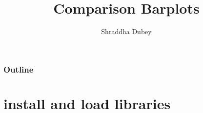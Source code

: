 \documentclass{beamer}\usepackage[]{graphicx}\usepackage[]{color}
\begin{document}
\title{Comparison Barplots}

\author{Shraddha Dubey}

\begin{frame}

  \titlepage

\end{frame}

\begin{frame}

  \frametitle{Outline}
    \tableofcontents

\end{frame}

\section{install and load libraries}
\end{document}
